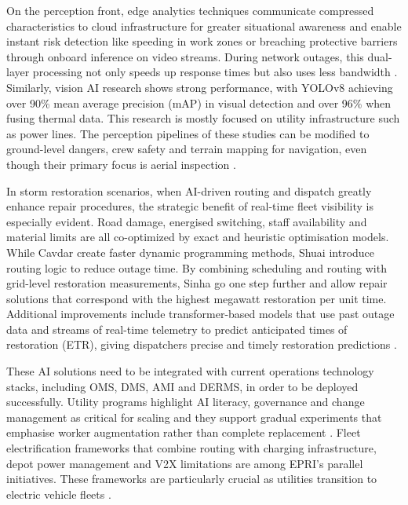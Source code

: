 On the perception front, edge analytics techniques communicate compressed characteristics to cloud infrastructure for greater situational awareness and enable instant risk detection like speeding in work zones or breaching protective barriers through onboard inference on video streams. During network outages, this dual-layer processing not only speeds up response times but also uses less bandwidth \cite{Katariya2024, Dong2024}. Similarly, vision AI research shows strong performance, with YOLOv8 achieving over 90\% mean average precision (mAP) in visual detection and over 96\% when fusing thermal data. This research is mostly focused on utility infrastructure such as power lines. The perception pipelines of these studies can be modified to ground-level dangers, crew safety and terrain mapping for navigation, even though their primary focus is aerial inspection \cite{Santos2024, Ejaz2024, Faisal2025}.

In storm restoration scenarios, when AI-driven routing and dispatch greatly enhance repair procedures, the strategic benefit of real-time fleet visibility is especially evident. Road damage, energised switching, staff availability and material limits are all co-optimized by exact and heuristic optimisation models. While Cavdar \cite{Cavdar2022} create faster dynamic programming methods, Shuai \cite{Shuai2023} introduce routing logic to reduce outage time. By combining scheduling and routing with grid-level restoration measurements, Sinha \cite{Sinha2024} go one step further and allow repair solutions that correspond with the highest megawatt restoration per unit time. Additional improvements include transformer-based models that use past outage data and streams of real-time telemetry to predict anticipated times of restoration (ETR), giving dispatchers precise and timely restoration predictions \cite{Teja2025}.

These AI solutions need to be integrated with current operations technology stacks, including OMS, DMS, AMI and DERMS, in order to be deployed successfully. Utility programs highlight AI literacy, governance and change management as critical for scaling and they support gradual experiments that emphasise worker augmentation rather than complete replacement \cite{EUTC2025}. Fleet electrification frameworks that combine routing with charging infrastructure, depot power management and V2X limitations are among EPRI's parallel initiatives. These frameworks are particularly crucial as utilities transition to electric vehicle fleets \cite{EPRI2025, EPRI2022}.

